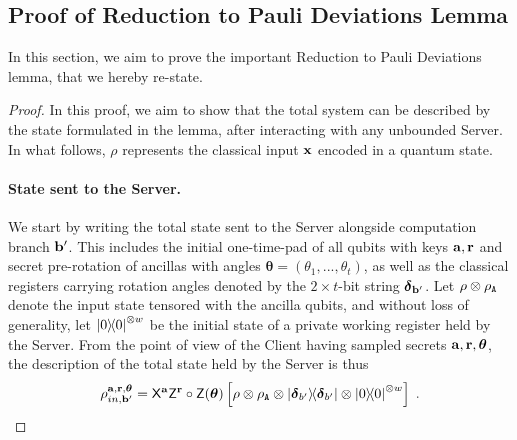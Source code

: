\subsection{Proof of Reduction to Pauli Deviations Lemma}
\label{subsection:proof of reduction to Pauli Dev}
In this section, we aim to prove the important Reduction to Pauli Deviations lemma, that we hereby re-state.
\paulidev*

\begin{proof}
    In this proof, we aim to show that the total system can be described by the state formulated in the lemma,
     after interacting with any unbounded Server. In what follows, $\rho$ represents the classical input $\mathbf x$ encoded in a quantum state.

    \paragraph{State sent to the Server.}
    We start by writing the total state sent to the Server alongside computation branch $\mathbf b'$. This includes the initial one-time-pad of all qubits with keys $\mathbf a, \mathbf r$ and secret pre-rotation of ancillas with angles $\boldsymbol{\theta}=(\theta_1, ..., \theta_t)$, as well as the classical registers carrying rotation angles denoted by the $2\times t$-bit string $\boldsymbol{\delta}_{\mathbf b'}$. Let $\rho\otimes \rho_{\mathtt{A}}$ denote the input state tensored with the ancilla qubits, and without loss of generality, let $\ketbra0^{\otimes w}$ be the initial state of a private working register held by the Server. From the point of view of the Client having sampled secrets $\mathbf a, \mathbf r, \boldsymbol{\theta}$, the description of the total state held by the Server is thus
    \begin{equation}
        \rho_{in, \mathbf b'}^{\mathbf a, \mathbf r, \boldsymbol{\theta}}
        =
        \mathsf{X}^{\mathbf a}\mathsf{Z}^{\mathbf r}
            \circ
            \mathsf{Z}(\boldsymbol\theta)
            \left[\rho
            \otimes
            \rho_{\mathtt{A}}
            \otimes
            \ketbra{\boldsymbol\delta_{b'}}
            \otimes
            \ketbra{0}^{\otimes w}\right]\; .
    \end{equation}


\end{proof}
